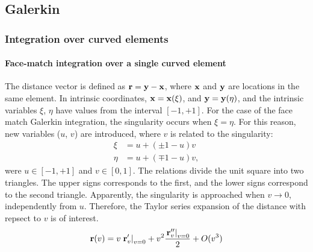 \subsection{Galerkin}

\subsubsection{Integration over curved elements}

\paragraph{Face-match integration over a single curved element}

The distance vector is defined as ${\bf r} = {\bf y} - {\bf x}$, where ${\bf x}$ and ${\bf y}$ are locations in the same element.
In intrinsic coordinates, ${\bf x} = {\bf x}(\xi)$, and ${\bf y} = {\bf y}(\eta)$, and the intrinsic variables $\xi$, $\eta$ have values from the interval $[-1, +1]$.
For the case of the face match Galerkin integration, the singularity occurs when $\xi = \eta$. 
For this reason, new variables ($u$, $v$) are introduced, where $v$ is related to the singularity:
%
\begin{align}
	\xi &= u + (\pm 1 - u) v \\
	\eta &= u + (\mp 1 - u) v,
\end{align}
%
were $u \in [-1, +1]$ and $v \in [0, 1]$.
The relations divide the unit square into two triangles. 
The upper signs corresponds to the first, and the lower signs correspond to the second triangle.
Apparently, the singularity is approached when $v \to 0$, independently from $u$.
Therefore, the Taylor series expansion of the distance with repsect to $v$ is of interest.
%
\begin{equation}
	{\bf r}(v) = v \left.{\bf r}'_v\right|_{v=0} + v^2 \frac{\left.{\bf r}''_v\right|_{v=0}}{2} + O(v^3)
\end{equation}

